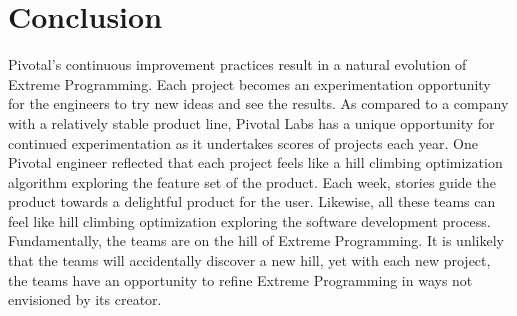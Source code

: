 \section{Conclusion}
Pivotal’s continuous improvement practices result in a natural evolution of Extreme Programming.  Each project becomes an experimentation opportunity for the engineers to try new ideas and see the results. As compared to a company with a relatively stable product line, Pivotal Labs has a unique opportunity for continued experimentation as it undertakes scores of projects each year. One Pivotal engineer reflected that each project feels like a hill climbing optimization algorithm exploring the feature set of the product. Each week, stories guide the product towards a delightful product for the user. Likewise, all these teams can feel like hill climbing optimization exploring the software development process. Fundamentally, the teams are on the hill of Extreme Programming. It is unlikely that the teams will accidentally discover a new hill, yet with each new project, the teams have an opportunity to refine Extreme Programming in ways not envisioned by its creator. 
